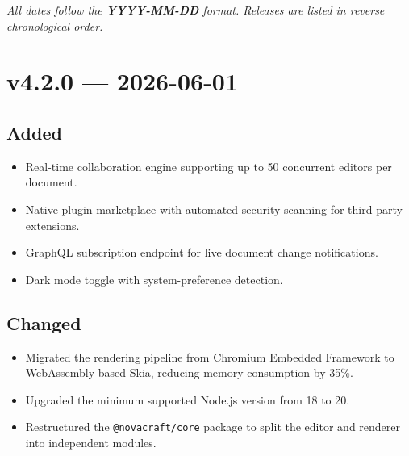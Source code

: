 \documentclass[
    language=english,
    doctype=article,
    institution=none,
]{../../omnilatex}
\begin{document}
\maketitle

\begin{abstract}
This document follows the \textbf{Keep a Changelog} format
\cite{keepachangelog} and tracks all notable changes to the NovaCraft
platform.  Each release entry is categorised as Added, Changed, Deprecated,
Removed, Fixed, or Security.
\end{abstract}

\tableofcontents

\vspace{1em}
\noindent\textit{All dates follow the \textbf{YYYY-MM-DD} format.  Releases
are listed in reverse chronological order.}

\section{v4.2.0 --- 2026-06-01}

\subsection{Added}
\begin{itemize}
    \item Real-time collaboration engine supporting up to 50 concurrent editors
          per document.
    \item Native plugin marketplace with automated security scanning for
          third-party extensions.
    \item GraphQL subscription endpoint for live document change notifications.
    \item Dark mode toggle with system-preference detection.
\end{itemize}

\subsection{Changed}
\begin{itemize}
    \item Migrated the rendering pipeline from Chromium Embedded Framework to
          WebAssembly-based Skia, reducing memory consumption by 35\%.
    \item Upgraded the minimum supported Node.js version from 18 to 20.
    \item Restructured the \texttt{@novacraft/core} package to split the
          editor and renderer into independent modules.
\end{itemize}
\end{document}
